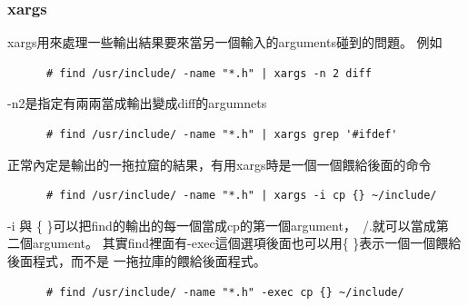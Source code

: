     \subsubsection{xargs}
    xargs用來處理一些輸出結果要來當另一個輸入的arguments碰到的問題。
    例如
    \begin{verbatim}
      # find /usr/include/ -name "*.h" | xargs -n 2 diff
    \end{verbatim}
    -n2是指定有兩兩當成輸出變成diff的argumnets
    \begin{verbatim}
      # find /usr/include/ -name "*.h" | xargs grep '#ifdef'
    \end{verbatim}
    正常內定是輸出的一拖拉窟的結果，有用xargs時是一個一個餵給後面的命令
    \begin{verbatim}
      # find /usr/include/ -name "*.h" | xargs -i cp {} ~/include/
    \end{verbatim}
    -i 與 \{ \}可以把find的輸出的每一個當成cp的第一個argument，~/.就可以當成第
    二個argument。
    其實find裡面有-exec這個選項後面也可以用\{ \}表示一個一個餵給後面程式，而不是
    一拖拉庫的餵給後面程式。
    \begin{verbatim}
      # find /usr/include/ -name "*.h" -exec cp {} ~/include/
    \end{verbatim}

